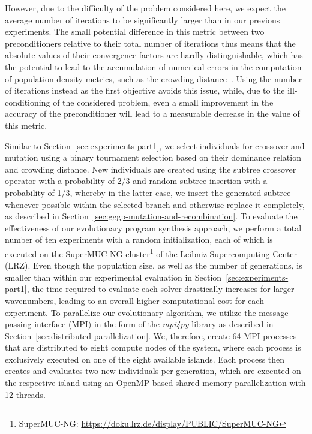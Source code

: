 However, due to the difficulty of the problem considered here, we expect the average number of iterations to be significantly larger than in our previous experiments. 
The small potential difference in this metric between two preconditioners relative to their total number of iterations thus means that the absolute values of their convergence factors are hardly distinguishable, which has the potential to lead to the accumulation of numerical errors in the computation of population-density metrics, such as the crowding distance~\cite{deb2002fast}.
Using the number of iterations instead as the first objective avoids this issue, while, due to the ill-conditioning of the considered problem, even a small improvement in the accuracy of the preconditioner will lead to a measurable decrease in the value of this metric.

Similar to Section~\ref{sec:experiments-part1}, we select individuals for crossover and mutation using a binary tournament selection based on their dominance relation and crowding distance.
New individuals are created using the subtree crossover operator with a probability of 2/3 and random subtree insertion with a probability of 1/3, whereby in the latter case, we insert the generated subtree whenever possible within the selected branch and otherwise replace it completely, as described in Section~\ref{sec:gggp-mutation-and-recombination}.
To evaluate the effectiveness of our evolutionary program synthesis approach, we perform a total number of ten experiments with a random initialization, each of which is executed on the SuperMUC-NG cluster\footnote{SuperMUC-NG: \url{https://doku.lrz.de/display/PUBLIC/SuperMUC-NG}} of the Leibniz Supercomputing Center (LRZ).
Even though the population size, as well as the number of generations, is smaller than within our experimental evaluation in Section~\ref{sec:experiments-part1}, the time required to evaluate each solver drastically increases for larger wavenumbers, leading to an overall higher computational cost for each experiment.
To parallelize our evolutionary algorithm, we utilize the message-passing interface (MPI) in the form of the \emph{mpi4py} library as described in Section~\ref{sec:distributed-parallelization}. 
We, therefore, create 64 MPI processes that are distributed to eight compute nodes of the system, where each process is exclusively executed on one of the eight available islands.
Each process then creates and evaluates two new individuals per generation, which are executed on the respective island using an OpenMP-based shared-memory parallelization with 12 threads.

